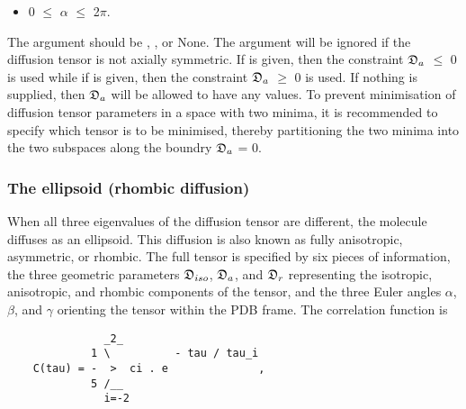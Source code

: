 \begin{itemize}
\item[] 0 $\le$ $\alpha$ $\le$ 2$\pi$. 
\end{itemize}


The  argument should be , , or None.  The argument will be ignored if the diffusion tensor is not axially symmetric.  If  is given, then the constraint $\mathfrak{D}_a$ $\le$ 0 is used while if  is given, then the constraint $\mathfrak{D}_a$ $\ge$ 0 is used.  If nothing is supplied, then $\mathfrak{D}_a$ will be allowed to have any values.  To prevent minimisation of diffusion tensor parameters in a space with two minima, it is recommended to specify which tensor is to be minimised, thereby partitioning the two minima into the two subspaces along the boundry $\mathfrak{D}_a$ = 0.



\subsubsection{The ellipsoid (rhombic diffusion)}

When all three eigenvalues of the diffusion tensor are different, the molecule diffuses as an ellipsoid.  This diffusion is also known as fully anisotropic, asymmetric, or rhombic. The full tensor is specified by six pieces of information, the three geometric parameters $\mathfrak{D}_{iso}$, $\mathfrak{D}_a$, and $\mathfrak{D}_r$ representing the isotropic, anisotropic, and rhombic components of the tensor, and the three Euler angles $\alpha$, $\beta$, and $\gamma$ orienting the tensor within the PDB frame.  The correlation function is


{\footnotesize \begin{verbatim}
               _2_
             1 \          - tau / tau_i
    C(tau) = -  >  ci . e              ,
             5 /__
               i=-2
\end{verbatim}}

